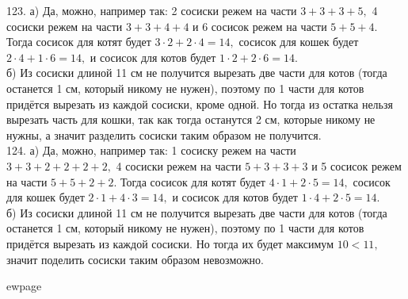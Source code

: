 123. а) Да, можно, например так: 2 сосиски режем на части $3+3+3+5,$ 4 сосиски режем на части $3+3+4+4$ и 6 сосисок режем на части $5+5+4.$ Тогда сосисок для котят будет $3\cdot2+2\cdot4=14,$ сосисок для кошек будет $2\cdot4+1\cdot6=14,$ и сосисок для котов будет $1\cdot2+2\cdot6=14.$\\
б) Из сосиски длиной 11 см не получится вырезать две части для котов (тогда останется 1 см, который никому не нужен), поэтому по 1 части для котов придётся вырезать из каждой сосиски, кроме одной. Но тогда из остатка нельзя вырезать часть для кошки, так как тогда останутся 2 см, которые никому не нужны, а значит разделить сосиски таким образом не получится.\\
124. а) Да, можно, например так: 1 сосиску режем на части $3+3+2+2+2+2,$ 4 сосиски режем на части $5+3+3+3$ и 5 сосисок режем на части $5+5+2+2.$ Тогда сосисок для котят будет $4\cdot1+2\cdot5=14,$ сосисок для кошек будет $2\cdot1+4\cdot3=14,$ и сосисок для котов будет $1\cdot4+2\cdot5=14.$\\
б) Из сосиски длиной 11 см не получится вырезать две части для котов (тогда останется 1 см, который никому не нужен), поэтому по 1 части для котов придётся вырезать из каждой сосиски. Но тогда их будет максимум $10<11,$ значит поделить сосиски таким образом невозможно.

ewpage
